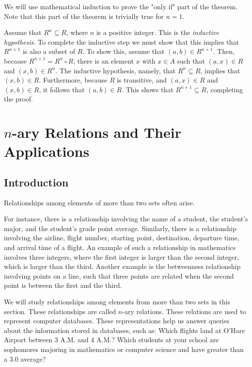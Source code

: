 \documentclass[11pt]{article}
\begin{document}
We will use mathematical induction to prove the "only if" part of the theorem. Note that this part of the theorem is trivially true for $n = 1$.

Assume that $R^n \subseteq R$, where $n$ is a positive integer. This is the \textit{inductive hypothesis}. To complete the inductive step we must show that this implies that $R^{n+1}$ is also a subset of $R$. To show this, assume that $(a, b) \in R^{n+1}$. Then, because $R^{n+1} = R^n \circ R$, there is an element $x$
with $x \in A$ such that $(a, x) \in R$ and $(x, b) \in R^n$. The inductive hypothesis, namely, that $R^n \subseteq R$, implies that $(x, b) \in R$. Furthermore, because $R$ is transitive, and $(a, x) \in R$ and $(x, b) \in R$, it follows that $(a, b) \in R$. This shows that $R^{n+1} \subseteq R$, completing the proof.


\section{$n$-ary Relations and Their Applications}

\subsection{Introduction}

Relationships among elements of more than two sets often arise. 

For instance, there is a relationship involving the name of a student, the student’s major, and the student’s grade point average. Similarly, there is a relationship involving the airline, flight number, starting point, destination,
departure time, and arrival time of a flight. An example of such a relationship in mathematics involves three integers, where the first integer is larger than the second integer, which is larger than the third. Another example is the betweenness relationship involving points on a line, such that three points are related when the second point is between the first and the third.

We will study relationships among elements from more than two sets in this section. These relationships are called $n$-ary relations. These relations are used to represent computer databases. These representations help us answer queries about the information stored in databases, such as: Which flights land at O’Hare Airport between 3 A.M. and 4 A.M.? Which students at your school are sophomores majoring in mathematics or computer science and have greater than a 3.0 average? 
\end{document}
